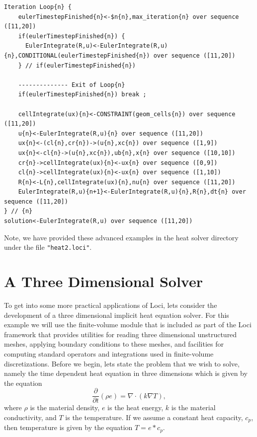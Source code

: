 \documentclass[10pt,epsf,letterpaper,twoside]{book}
\begin{document}
\begin{verbatim}
Iteration Loop{n} {
    eulerTimestepFinished{n}<-$n{n},max_iteration{n} over sequence ([11,20])
    if(eulerTimestepFinished{n}) {
      EulerIntegrate(R,u)<-EulerIntegrate(R,u){n},CONDITIONAL(eulerTimestepFinished{n}) over sequence ([11,20])
    } // if(eulerTimestepFinished{n})

    -------------- Exit of Loop{n}
    if(eulerTimestepFinished{n}) break ;

    cellIntegrate(ux){n}<-CONSTRAINT(geom_cells{n}) over sequence ([11,20])
    u{n}<-EulerIntegrate(R,u){n} over sequence ([11,20])
    ux{n}<-(cl{n},cr{n})->(u{n},xc{n}) over sequence ([1,9])
    ux{n}<-cl{n}->(u{n},xc{n}),ub{n},x{n} over sequence ([10,10])
    cr{n}->cellIntegrate(ux){n}<-ux{n} over sequence ([0,9])
    cl{n}->cellIntegrate(ux){n}<-ux{n} over sequence ([1,10])
    R{n}<-L{n},cellIntegrate(ux){n},nu{n} over sequence ([11,20])
    EulerIntegrate(R,u){n+1}<-EulerIntegrate(R,u){n},R{n},dt{n} over sequence ([11,20])
} // {n}
solution<-EulerIntegrate(R,u) over sequence ([11,20])
\end{verbatim}

Note, we have provided these advanced examples in the heat solver
directory under the file {\tt "heat2.loci"}.



\chapter{A Three Dimensional Solver}

To get into some more practical applications of Loci, lets consider
the development of a three dimensional implicit heat equation solver.
For this example we will use the finite-volume module that is included
as part of the Loci framework that provides utilities for reading
three dimensional unstructured meshes, applying boundary conditions to
these meshes, and facilities for computing standard operators and
integrations used in finite-volume discretizations.  Before we begin,
lets state the problem that we wish to solve, namely the time
dependent heat equation in three dimensions which is given by the equation
\begin{equation}
\frac{\partial}{\partial t} (\rho e) = \nabla \cdot (k \nabla T),
\end{equation}
where $\rho$ is the material density, $e$ is the heat energy, $k$ is
the material conductivity, and $T$ is the temperature.  If we assume a
constant heat capacity, $c_p$, then temperature is given by the
equation $T=e*c_p$.
\end{document}
